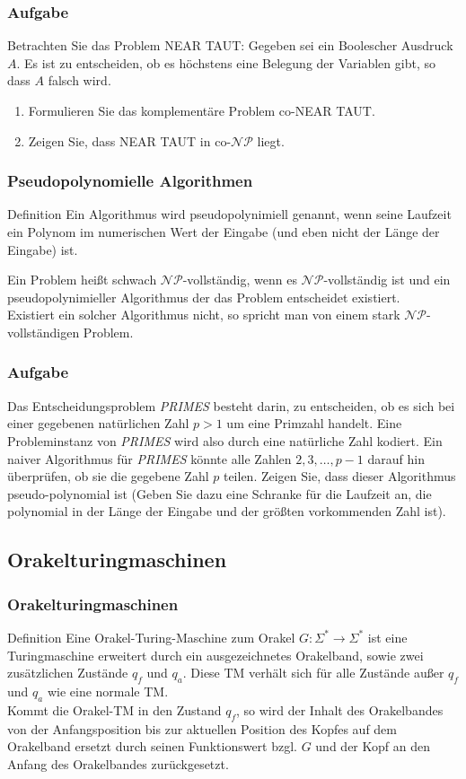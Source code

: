 \documentclass{beamer}
\begin{document}
{\begin{frame}
\frametitle{Aufgabe}
Betrachten Sie das Problem NEAR TAUT: Gegeben sei ein Boolescher Ausdruck $A$. Es ist zu entscheiden, ob es höchstens eine Belegung der Variablen gibt, so dass $A$ falsch wird.
\begin{enumerate}
 \item Formulieren Sie das komplementäre Problem co-NEAR TAUT.
 \item Zeigen Sie, dass NEAR TAUT in co-$\mathcal{NP}$ liegt.
\end{enumerate}
\end{frame}
\begin{frame}
\frametitle{Pseudopolynomielle Algorithmen}
\begin{block}{Definition}
Ein Algorithmus wird pseudopolynimiell genannt, wenn seine Laufzeit ein Polynom im numerischen Wert der Eingabe (und eben nicht der Länge der Eingabe) ist.
\end{block}
Ein Problem heißt schwach $\mathcal{NP}$-vollständig, wenn es $\mathcal{NP}$-vollständig ist und ein pseudopolynimieller Algorithmus der das Problem entscheidet existiert.\\
Existiert ein solcher Algorithmus nicht, so spricht man von einem stark $\mathcal{NP}$-vollständigen Problem.
\end{frame}

\begin{frame}
\frametitle{Aufgabe}
Das Entscheidungsproblem \textit{PRIMES} besteht darin, zu entscheiden, ob es sich bei einer gegebenen natürlichen Zahl $p>1$ um eine Primzahl handelt. 
Eine Probleminstanz von \textit{PRIMES} wird also durch eine natürliche Zahl kodiert. 
Ein naiver Algorithmus für \textit{PRIMES} könnte alle Zahlen $2,3,\ldots,p-1$ darauf hin überprüfen, ob sie die gegebene Zahl $p$ teilen. 
Zeigen Sie, dass dieser Algorithmus pseudo-polynomial ist 
(Geben Sie dazu eine Schranke für die Laufzeit an, die polynomial in der Länge der Eingabe und der größten vorkommenden Zahl ist).
\end{frame}

\subsection{Orakelturingmaschinen}
\begin{frame}
\frametitle{Orakelturingmaschinen}
\begin{block}{Definition}
Eine Orakel-Turing-Maschine zum Orakel $G: \Sigma^* \rightarrow \Sigma^*$ ist eine Turingmaschine erweitert durch ein ausgezeichnetes Orakelband, sowie zwei zusätzlichen Zustände $q_f$ und $q_a$. Diese TM verhält sich für alle Zustände außer $q_f$ und $q_a$ wie eine normale TM.\\
Kommt die Orakel-TM in den Zustand $q_f$, so wird der Inhalt des Orakelbandes von der Anfangsposition bis zur aktuellen Position des Kopfes auf dem Orakelband ersetzt durch seinen Funktionswert bzgl. $G$ und der Kopf an den Anfang des Orakelbandes zurückgesetzt.
\end{block}
\end{frame}

}
\end{document}
